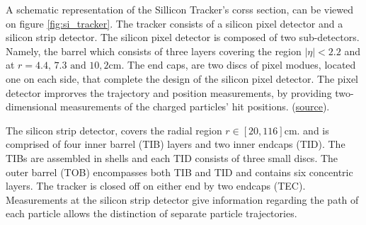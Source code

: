 A schematic representation of the Sillicon Tracker's corss section, can be viewed on figure \ref{fig:si_tracker}. The tracker consists of a silicon pixel detector and a silicon strip detector. The silicon pixel detector is composed of two sub-detectors. Namely, the barrel which consists of three layers covering the region \(|\eta| < 2.2\) and at \(r = 4.4\text{, }7.3\text{ and }10,2\text{cm}\). The end caps, are two discs of pixel modues, located one on each side, that complete the design of the silicon pixel detector. The pixel detector improrves the trajectory and position measurements, by providing two-dimensional measurements of the charged particles' hit positions. (\href{https://cds.cern.ch/record/1129810}{source}).

The silicon strip detector, covers the radial region \(r \in \left[ 20, 116 \right]\text{cm}\). and  is comprised of four inner barrel (TIB) layers and two inner endcaps (TID). The TIBs are assembled in shells and each TID consists of three small discs. The outer barrel (TOB) encompasses both TIB and TID and contains six concentric layers. The tracker is closed off on either end by two endcaps (TEC). Measurements at the silicon strip detector give information regarding the path of each particle allows the distinction of separate particle trajectories.
